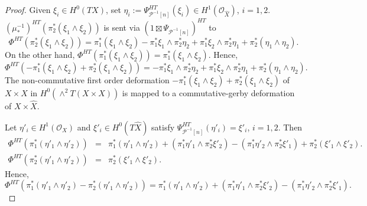 \documentclass[12pt]{amsart}
\numberwithin{equation}{subsection}
\theoremstyle{plain}
\theoremstyle{definition}
\renewcommand{\P}{{\mathcal P}}
\newcommand{\StructureSheaf}[1]{{\mathcal O}_{#1}}
\begin{document}
\begin{proof}
Given $\xi_i\in H^0(TX)$,  set $\eta_i:=\Psi_{\P^{-1}[n]}^{HT}(\xi_i)\in H^1(\StructureSheaf{\hat{X}})$, $i=1,2$.
$(\mu^{-1}_*)^{HT}(\pi_2^*(\xi_1\wedge\xi_2))$ is sent via $(1\boxtimes \Psi_{\P^{-1}[n]})^{HT}$ to
\[
\Phi^{HT}(\pi_2^*(\xi_1\wedge\xi_2))=
\pi_1^*(\xi_1\wedge\xi_2)-\pi_1^*\xi_1\wedge\pi_2^*\eta_2+\pi_1^*\xi_2\wedge\pi_2^*\eta_1+\pi_2^*(\eta_1\wedge\eta_2).
\]
On the other hand, $\Phi^{HT}(\pi_1^*(\xi_1\wedge\xi_2))=\pi_1^*(\xi_1\wedge\xi_2)$. Hence,
\begin{equation}
\label{eq-Phi-HT-takes-non-commutative-anti-diagonal-deformations-to-commutative}
\Phi^{HT}(-\pi_1^*(\xi_1\wedge\xi_2)+\pi_2^*(\xi_1\wedge\xi_2))=
-\pi_1^*\xi_1\wedge\pi_2^*\eta_2+\pi_1^*\xi_2\wedge\pi_2^*\eta_1+\pi_2^*(\eta_1\wedge\eta_2).
\end{equation}
The non-commutative first order deformation $-\pi_1^*(\xi_1\wedge\xi_2)+\pi_2^*(\xi_1\wedge\xi_2)$ of $X\times X$ in $H^0(\wedge^2T(X\times X))$ is mapped to a commutative-gerby deformation of $X\times\hat{X}$.

Let $\eta'_i\in H^1(\StructureSheaf{X})$ and $\xi'_i\in H^0(T\hat{X})$ satisfy $\Psi_{\P^{-1}[n]}^{HT}(\eta'_i)=\xi'_i$, $i=1,2$. Then
\begin{eqnarray*}
\nonumber
\Phi^{HT}(\pi_1^*(\eta'_1\wedge\eta'_2))&=&
\pi_1^*(\eta'_1\wedge\eta'_2)+(\pi_1^*\eta'_1\wedge\pi_2^*\xi'_2)-(\pi_1^*\eta'_2\wedge\pi_2^*\xi'_1)+\pi_2^*(\xi'_1\wedge\xi'_2).
\\
\nonumber
\Phi^{HT}(\pi_2^*(\eta'_1\wedge\eta'_2))&=&\pi_2^*(\xi'_1\wedge\xi'_2).
\end{eqnarray*}
Hence,
\begin{equation}
\label{eq-Phi-HT-takes-gerby-anti-diagonal-deformations-to-gerby-commutative}
\Phi^{HT}(\pi_1^*(\eta'_1\wedge\eta'_2)-\pi_2^*(\eta'_1\wedge\eta'_2))=
\pi_1^*(\eta'_1\wedge\eta'_2)+(\pi_1^*\eta'_1\wedge\pi_2^*\xi'_2)-(\pi_1^*\eta'_2\wedge\pi_2^*\xi'_1).
\end{equation}


\end{proof}
\end{document}
